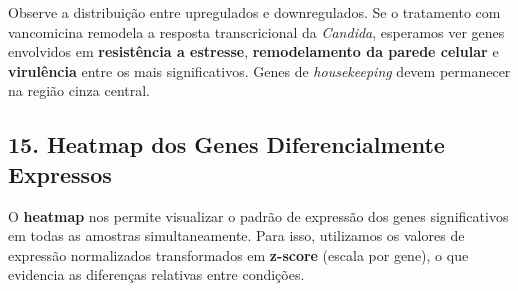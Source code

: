 \documentclass[
  letterpaper,
  DIV=11,
  numbers=noendperiod]{scrreprt}
\begin{document}
\begin{tcolorbox}[enhanced jigsaw, arc=.35mm, bottomrule=.15mm, bottomtitle=1mm, breakable, colback=white, colbacktitle=quarto-callout-tip-color!10!white, colframe=quarto-callout-tip-color-frame, coltitle=black, left=2mm, leftrule=.75mm, opacityback=0, opacitybacktitle=0.6, rightrule=.15mm, title=\textcolor{quarto-callout-tip-color}{\faLightbulb}\hspace{0.5em}{O que o Volcano Plot nos diz biologicamente?}, titlerule=0mm, toprule=.15mm, toptitle=1mm]

Observe a distribuição entre upregulados e downregulados. Se o
tratamento com vancomicina remodela a resposta transcricional da
\emph{Candida}, esperamos ver genes envolvidos em \textbf{resistência a
estresse}, \textbf{remodelamento da parede celular} e
\textbf{virulência} entre os mais significativos. Genes de
\emph{housekeeping} devem permanecer na região cinza central.

\end{tcolorbox}

\subsection{15. Heatmap dos Genes Diferencialmente
Expressos}\label{heatmap-dos-genes-diferencialmente-expressos}

O \textbf{heatmap} nos permite visualizar o padrão de expressão dos
genes significativos em todas as amostras simultaneamente. Para isso,
utilizamos os valores de expressão normalizados transformados em
\textbf{z-score} (escala por gene), o que evidencia as diferenças
relativas entre condições.
\end{document}
